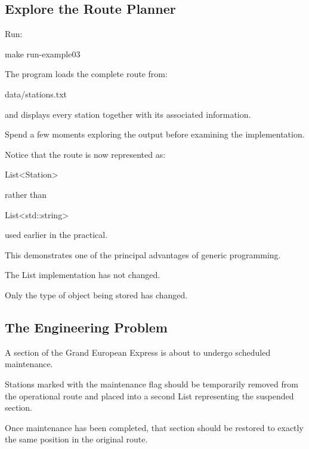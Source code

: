 \documentclass{csc2059practical}
\begin{document}
\subsection{Explore the Route Planner}

Run:

\begin{terminal}
make run-example03
\end{terminal}

The program loads the complete route from:

\begin{terminal}
data/stations.txt
\end{terminal}

and displays every station together with its associated information.

Spend a few moments exploring the output before examining the implementation.

Notice that the route is now represented as:

\begin{cppcode}
List<Station>
\end{cppcode}

rather than

\begin{cppcode}
List<std::string>
\end{cppcode}

used earlier in the practical.

This demonstrates one of the principal advantages of generic programming.

The List implementation has not changed.

Only the type of object being stored has changed.




\subsection{The Engineering Problem}

A section of the Grand European Express is about to undergo scheduled maintenance.

Stations marked with the maintenance flag should be temporarily removed from the operational route and placed into a second List representing the suspended section.

Once maintenance has been completed, that section should be restored to exactly the same position in the original route.
\end{document}
